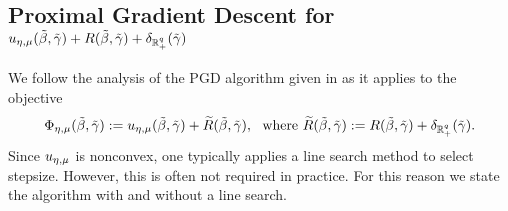 
\subsection{Proximal Gradient Descent for \texorpdfstring{${u_{\eta,\mu}}(\tilde\beta,{\tilde{\gamma}}) + R(\tilde\beta,{\tilde{\gamma}})+\delta_{\operatorname{\mathbb{R}}^q_+}({\tilde{\gamma}})$}{}} 
\label{sec:pgd}

We follow the analysis of the PGD algorithm given in \cite[Chapter 10]{AB17}
as it applies to the objective
\begin{equation}\label{eq:varphi}
\Phi_\emu\tbg:=\uemu\tbg +\tR\tbg,\ \ \text{where}\ 
\tR\tbg:=R\tbg+\del_{\Rqp}(\tgam).
\end{equation}
%
Since $u_{\eta,\mu}$ is nonconvex, one typically 
applies a line search method to select stepsize. 
However, this is often not required in practice. 
For this reason we state the algorithm with and without a line search.
\medskip





